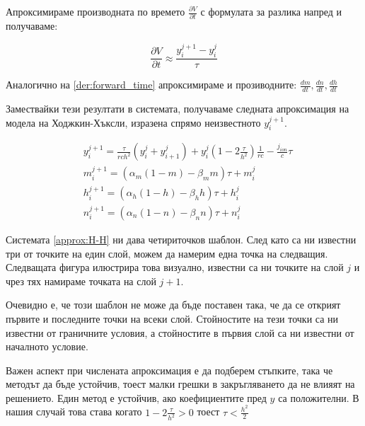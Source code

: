 \documentclass{article}
\numberwithin{equation}{section}
\begin{document}
    Апроксимираме производната по времето $\frac{\partial V}{\partial t}$ с формулата за разлика напред и получаваме:

    \begin{equation}\label{der:forward_time}
        \frac{\partial V}{\partial t} \approx \frac{y_i^{j+1} - y_i^j}{\tau}
    \end{equation}

    Аналогично на \eqref{der:forward_time} апроксимираме и прозиводните: $\frac{dm}{dt}, \frac{dn}{dt}, \frac{dh}{dt}$

    Замествайки тези резултати в системата, получаваме следната апроксимация на модела на Ходжкин-Хъксли, изразена спрямо неизвестното
    $y_i^{j+1}$.

    \begin{equation}\label{approx:H-H}
        \begin{aligned}
            &y_i^{j+1} = \frac{\tau}{rch^2}\left(y_i^j +y_{i+1}^j\right) + y_i^j\left(1 - 2\frac{\tau}{h^2}\right)\frac{1}{rc}
            - \frac{j_{ion}}{c}\tau\\
            &m_i^{j+1} = \left(\alpha_m(1-m) - \beta_mm\right)\tau + m_i^j\\
            &h_i^{j+1} = \left(\alpha_h(1-h) - \beta_hh\right)\tau + h_i^j\\
            &n_i^{j+1} = \left(\alpha_n(1-n) - \beta_nn\right)\tau + n_i^j
    \end{aligned}
    \end{equation}

    Системата \eqref{approx:H-H} ни дава четириточков шаблон. След като са ни известни три от точките на един слой, можем да намерим една точка
    на следващия. Следващата фигура илюстрира това визуално, известни са ни точките на слой $j$ и чрез тях намираме точката на слой $j+1$.
    \begin{figure}[h!]
        \begin{center}
        
        \caption{}
        \end{center}
    \end{figure}

    Очевидно е, че този шаблон не може да бъде поставен така, че да се открият първите и последните точки на всеки слой. Стойностите на тези
    точки са ни известни от граничните условия, а стойностите в първия слой са ни известни от началното условие.

    Важен аспект при числената апроксимация е да подберем стъпките, така че методът да бъде устойчив, тоест малки грешки в закръгляването да
    не влияят на решението. Един метод е устойчив, ако коефициентите пред $y$ са положителни. В нашия случай това става когато $1 -
    2\frac{\tau}{h^2} > 0$ тоест $\tau < \frac{h^2}{2}$
\end{document}

